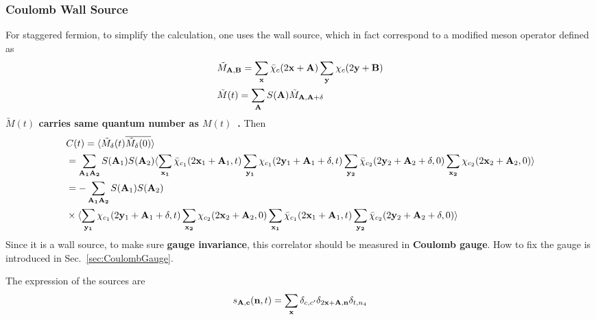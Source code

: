 \subsubsection{\label{CoulombWallSource}Coulomb Wall Source}

For staggered fermion, to simplify the calculation, one uses the wall source, which in fact correspond to a modified meson operator defined as
\begin{equation}
\begin{split}
&\tilde{M}_{{\bf A},{\bf B}}= \sum _{\bf x}\bar{\chi}_c(2{\bf x}+{\bf A}) \sum _{\bf y}\chi _c (2{\bf y}+{\bf B})\\
&\tilde{M}(t) = \sum _{\bf A} S({\bf A})\tilde{M}_{{\bf A},{\bf A}+\delta}
\end{split}
\end{equation}
\textbf{\textcolor[rgb]{0,0,1}{$\tilde{M}(t)$ carries same quantum number as $M(t)$~\cite{staggeredMeson}.}} Then
\begin{equation}
\begin{split}
&C(t)=\langle \tilde{M}_{\delta}(t) \overline{\tilde{M} _{\delta}(0)}\rangle \\
&= \sum _{\bf A _1 A_2}S({\bf A}_1)S({\bf A}_2)\langle \sum _{\bf x _1}\bar{\chi}_{c_1}(2{\bf x}_1+{\bf A}_1,t) \sum _{\bf y _1}\chi _{c_1} (2{\bf y}_1+{\bf A}_1+\delta,t)  \sum _{\bf y_2}\bar{\chi} _{c_2} (2{\bf y}_2+{\bf A}_2+\delta,0) \sum _{\bf x _2} \chi_{c_2}(2{\bf x}_2+{\bf A}_2,0)\rangle\\
&=-\sum _{\bf A _1 A_2}S({\bf A}_1)S({\bf A}_2)\\
&\times \langle \sum _{\bf y _1}\chi _{c_1} (2{\bf y}_1+{\bf A}_1+\delta,t) \sum _{\bf x _2} \chi_{c_2}(2{\bf x}_2+{\bf A}_2,0) \sum _{\bf x _1}\bar{\chi}_{c_1}(2{\bf x}_1+{\bf A}_1,t)  \sum _{\bf y_2}\bar{\chi} _{c_2} (2{\bf y}_2+{\bf A}_2+\delta,0) \rangle\\
\end{split}
\end{equation}
Since it is a wall source, to make sure \textbf{gauge invariance}, this correlator should be measured in \textcolor[rgb]{0,0,1}{\textbf{Coulomb gauge}}. How to fix the gauge is introduced in Sec.~\ref{sec:CoulombGauge}.

The expression of the sources are
\begin{equation}
\begin{split}
&s_{\bf A,c}({\bf n}, t) = \sum _{{\bf x}} \delta _{c,c'}\delta _{2{\bf x}+{\bf A},{\bf n}}\delta _{t,n_4}\\
\end{split}
\end{equation}


